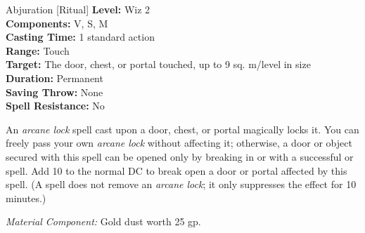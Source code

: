 {Abjuration [Ritual]}
{
	\textbf{Level:}
	Wiz 2\\
	\textbf{Components:}
	V, S, M\\
	\textbf{Casting Time:}
	1 standard action\\
	\textbf{Range:}
	Touch\\
	\textbf{Target:}
	The door, chest, or portal touched, up to 9 sq. m/level in size\\
	\textbf{Duration:}
	Permanent\\
	\textbf{Saving Throw:}
	None\\
	\textbf{Spell Resistance:}
	No\\
}
{
	An \emph{arcane lock} spell cast upon a door, chest, or portal magically locks it. You can freely pass your own \emph{arcane lock} without affecting it; otherwise, a door or object secured with this spell can be opened only by breaking in or with a successful  or  spell. Add 10 to the normal DC to break open a door or portal affected by this spell. (A  spell does not remove an \emph{arcane lock}; it only suppresses the effect for 10 minutes.)

	\textit{Material Component:}
	Gold dust worth 25 gp.

}
